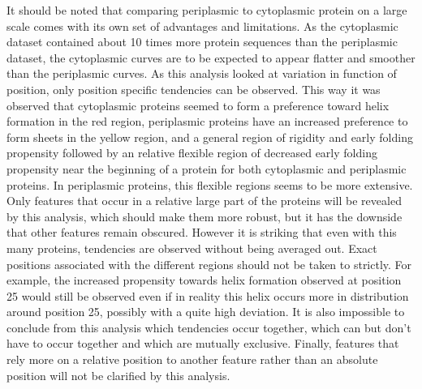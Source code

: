 It should be noted that comparing periplasmic to cytoplasmic protein on a large scale comes with its own set of advantages and limitations.
As the cytoplasmic dataset contained about 10 times more protein sequences than the periplasmic dataset,
the cytoplasmic curves are to be expected to appear flatter and smoother than the periplasmic curves.
As this analysis looked at variation in function of position,
only position specific tendencies can be observed.
This way it was observed that cytoplasmic proteins seemed to form a preference toward helix formation in the red region,
periplasmic proteins have an increased preference to form sheets in the yellow region,
and a general region of rigidity and early folding propensity followed by an relative flexible region of decreased early folding propensity near the beginning of a protein for both cytoplasmic and periplasmic proteins.
In periplasmic proteins, this flexible regions seems to be more extensive.
Only features that occur in a relative large part of the proteins will be revealed by this analysis,
which should make them more robust, but it has the downside that other features remain obscured.
However it is striking that even with this many proteins,
tendencies are observed without being averaged out.
Exact positions associated with the different regions should not be taken to strictly.
For example, the increased propensity towards helix formation observed at position 25  
would still be observed even if in reality this helix occurs more in distribution around position 25,
possibly with a quite high deviation.
It is also impossible to conclude from this analysis which tendencies occur together, which can but don't have to occur together and which are mutually exclusive.
Finally, 
features that rely more on a relative position to another feature rather than an absolute position will not be clarified by this analysis.
